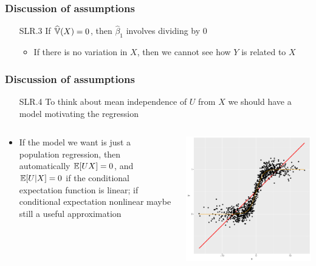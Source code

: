 \begin{frame}[allowframebreaks]
  \frametitle{Discussion of assumptions}
  \begin{itemize}
  \item[SLR.3] If $\widehat{\mathbb{V}}(X) = 0$, then 
    $\hat{\beta}_1$ involves dividing by $0$
    \begin{itemize}
    \item If there is no variation in $X$, then we cannot see how
      $Y$ is related to $X$
    \end{itemize}
  \end{itemize}
\end{frame}

\begin{frame}[allowframebreaks]
  \frametitle{Discussion of assumptions}
  \begin{itemize}
  \item[SLR.4] To think about mean independence of $U$ from $X$
    we should have a model motivating the regression
  \end{itemize}
  \begin{columns}[c] %
    \begin{column}{.48\textwidth}
      \begin{itemize}
      \item If the model we want is just a population regression,
        then automatically $\mathbb{E}[UX] = 0$, and $\mathbb{E}[U|X] =
        0$ if the conditional expectation function is linear; if
        conditional expectation nonlinear maybe still a useful
        approximation       
      \end{itemize}
    \end{column}
    \begin{column}{.48\textwidth}
      \includegraphics[width=\textwidth]{nonlinear} \\

\end{column}
\end{columns}
\end{frame}
